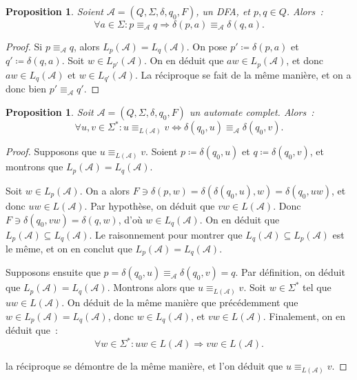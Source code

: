 \documentclass{article}
\newtheorem{prp}[thm]{Proposition}
\theoremstyle{definition}
\theoremstyle{remark}
\newcommand{\automaton}{(Q, \Sigma, \delta, q_0, F)}
\begin{document}
	\begin{prp}\label{prp:états équivalents -> transitions équivalentes} Soient $\mathcal A = \automaton$, un DFA, et $p, q \in Q$. Alors~:
	\[\forall a \in \Sigma : p \equiv_{\mathcal A} q \Rightarrow \delta(p, a) \equiv_{\mathcal A} \delta(q, a).\]
	\end{prp}

	\begin{proof} Si $p \equiv_{\mathcal A} q$, alors $L_p(\mathcal A) = L_q(\mathcal A)$. On pose $p' \coloneqq \delta(p, a)$ et $q' \coloneqq \delta(q, a)$.
	Soit $w \in L_{p'}(\mathcal A)$. On en déduit que $aw \in L_p(\mathcal A)$, et donc $aw \in L_q(\mathcal A)$ et $w \in L_{q'}(\mathcal A)$. La réciproque
	se fait de la même manière, et on a donc bien $p' \equiv_{\mathcal A} q'$.
	\end{proof}

	\begin{prp} Soit $\mathcal A = \automaton$ un automate complet. Alors~:
	\[\forall u, v \in \Sigma^* : u \equiv_{L(\mathcal A)} v \iff \delta(q_0, u) \equiv_{\mathcal A} \delta(q_0, v).\]
	\end{prp}

	\begin{proof} Supposons que $u \equiv_{L(\mathcal A)} v$. Soient $p \coloneqq \delta(q_0, u)$ et $q \coloneqq \delta(q_0, v)$, et montrons que
	$L_p(\mathcal A) = L_q(\mathcal A)$.

	Soit $w \in L_p(\mathcal A)$. On a alors $F \ni \delta(p, w) = \delta(\delta(q_0, u), w) = \delta(q_0, uw)$, et donc $uw \in L(\mathcal A)$.
	Par hypothèse, on déduit que $vw \in L(\mathcal A)$. Donc $F \ni \delta(q_0, vw) = \delta(q, w)$, d'où $w \in L_q(\mathcal A)$. On en déduit que
	$L_p(\mathcal A) \subseteq L_q(\mathcal A)$. Le raisonnement pour montrer que $L_q(\mathcal A) \subseteq L_p(\mathcal A)$ est le même, et on en conclut que
	$L_p(\mathcal A) = L_q(\mathcal A)$.

	Supposons ensuite que $p = \delta(q_0, u) \equiv_{\mathcal A} \delta(q_0, v) = q$. Par définition, on déduit que $L_p(\mathcal A) = L_q(\mathcal A)$.
	Montrons alors que $u \equiv_{L(\mathcal A)} v$. Soit $w \in \Sigma^*$ tel que $uw \in L(\mathcal A)$. On déduit de la même manière que précédemment que
	$w \in L_p(\mathcal A) = L_q(\mathcal A)$, donc $w \in L_q(\mathcal A)$, et $vw \in L(\mathcal A)$. Finalement, on en déduit que~:
	\[\forall w \in \Sigma^* : uw \in L(\mathcal A) \Rightarrow vw \in L(\mathcal A).\]

	la réciproque se démontre de la même manière, et l'on déduit que $u \equiv_{L(\mathcal A)} v$.
	\end{proof}
\end{document}
